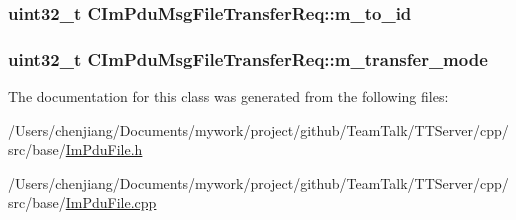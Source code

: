 \subsubsection[{m\+\_\+to\+\_\+id}]{\setlength{\rightskip}{0pt plus 5cm}uint32\+\_\+t C\+Im\+Pdu\+Msg\+File\+Transfer\+Req\+::m\+\_\+to\+\_\+id\hspace{0.3cm}{\ttfamily [private]}}\label{class_c_im_pdu_msg_file_transfer_req_add6b710155c5c33c5af00b8695fac280}
\hypertarget{class_c_im_pdu_msg_file_transfer_req_aa81f9a5fce5a6ba298f2fdc0a74a92ca}{}
\subsubsection[{m\+\_\+transfer\+\_\+mode}]{\setlength{\rightskip}{0pt plus 5cm}uint32\+\_\+t C\+Im\+Pdu\+Msg\+File\+Transfer\+Req\+::m\+\_\+transfer\+\_\+mode\hspace{0.3cm}{\ttfamily [private]}}\label{class_c_im_pdu_msg_file_transfer_req_aa81f9a5fce5a6ba298f2fdc0a74a92ca}


The documentation for this class was generated from the following files\+:\begin{DoxyCompactItemize}
\item 
/\+Users/chenjiang/\+Documents/mywork/project/github/\+Team\+Talk/\+T\+T\+Server/cpp/src/base/\hyperlink{_im_pdu_file_8h}{Im\+Pdu\+File.\+h}\item 
/\+Users/chenjiang/\+Documents/mywork/project/github/\+Team\+Talk/\+T\+T\+Server/cpp/src/base/\hyperlink{_im_pdu_file_8cpp}{Im\+Pdu\+File.\+cpp}\end{DoxyCompactItemize}
